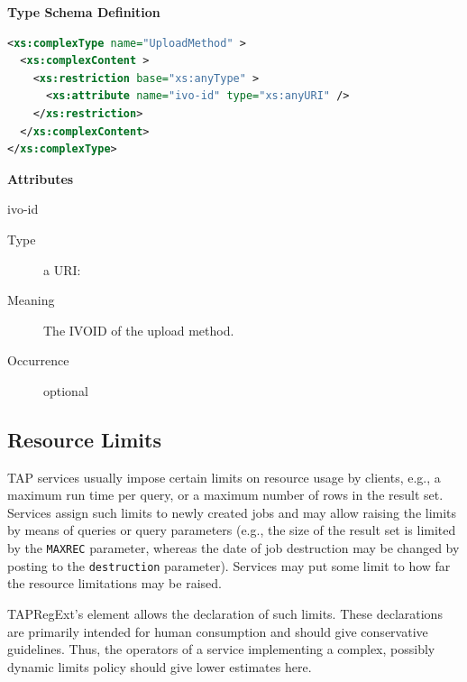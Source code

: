 \documentclass{ivoa}
\begin{document}
\vspace{1ex}\noindent\textbf{ Type Schema Definition}

\begin{lstlisting}[language=XML,basicstyle=\footnotesize]
<xs:complexType name="UploadMethod" >
  <xs:complexContent >
    <xs:restriction base="xs:anyType" >
      <xs:attribute name="ivo-id" type="xs:anyURI" />
    </xs:restriction>
  </xs:complexContent>
</xs:complexType>
\end{lstlisting}

\vspace{0.5ex}\noindent\textbf{ Attributes}

\begingroup\small\begin{bigdescription}
\item[ivo-id]
\begin{description}
\item[Type] a URI: 
\item[Meaning] 
            The IVOID of the upload method.
            
\item[Occurrence] optional
\end{description}


\end{bigdescription}\endgroup

\endgroup

\subsection{Resource Limits}

\label{reslimits}

TAP services usually impose certain limits on resource usage by clients,
e.g., a maximum run time per query, or a maximum number of rows in the result
set.  Services assign such limits to newly created jobs and may
allow raising the limits by means of queries or query parameters (e.g., the
size of the result set is limited by the \texttt{MAXREC} parameter, whereas
the date of job destruction may be changed by posting to the
\texttt{destruction} parameter).  Services may put some limit to how
far the resource limitations may be raised.

TAPRegExt's  element allows the declaration of such limits.
These declarations are primarily intended for human consumption and should give
conservative guidelines.  Thus, the operators of a service implementing a
complex, possibly dynamic limits policy should give lower estimates here.
\end{document}
